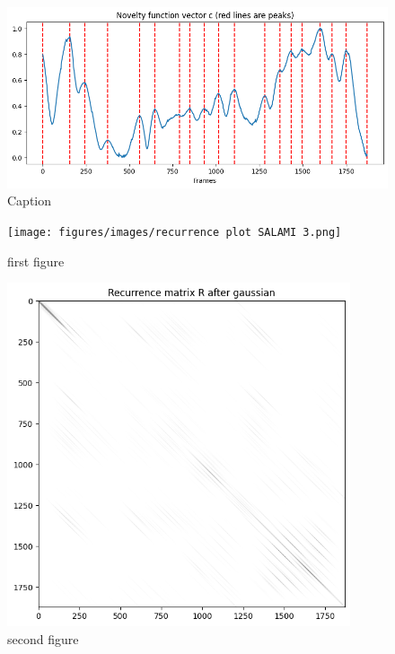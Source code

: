 \begin{figure}
    \centering
    \includegraphics[width=\textwidth]{figures/images/noveltypeaks_SALAMI_track_2.png}
    \caption[Novelty curve]{Caption}
    \label{fig:embeddiogram}
\end{figure}

\begin{figure}[ht]
    \centering
    \begin{minipage}{0.45\textwidth}
        \centering
        \texttt{[image: figures/images/recurrence plot SALAMI 3.png]} %
        \caption{first figure}
    \end{minipage}\hfill
    \begin{minipage}{0.45\textwidth}
        \centering
        \includegraphics[width=0.9\textwidth]{figures/images/Rec_matrix_smooth_SALAMI_track_2.png} %
        \caption{second figure}
    \end{minipage}
\end{figure}

